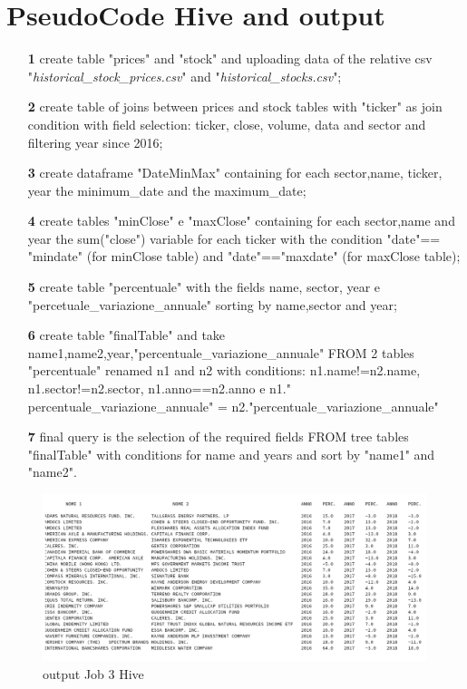 \documentclass[]{report}
\begin{document}
\section*{PseudoCode Hive and output}
	\begin{itemize}
	\item[\textbf{1}] create table "prices" and "stock" and uploading data of the relative csv "\textit{historical\_stock\_prices.csv}" and "\textit{historical\_stocks.csv}";
	\item[\textbf{2}] create table of joins between prices and stock tables with "ticker" as join condition with field selection: ticker, close, volume, data and sector and filtering year since 2016;
	\item[\textbf{3}]  create dataframe "DateMinMax" containing for each sector,name, ticker, year the minimum\_date and the maximum\_date;
	\item[\textbf{4}] create tables "minClose" e "maxClose" containing for each sector,name and year the sum("close") variable for each ticker with the condition "date"== "mindate" (for minClose table) and "date"=="maxdate" (for maxClose table);
	\item[\textbf{5}] create table "percentuale" with the fields name, sector, year e "percetuale\_variazione\_annuale" sorting by name,sector and year;
	\item[\textbf{6}] create table "finalTable" and take name1,name2,year,"percentuale\_variazione\_annuale" FROM 2 tables "percentuale" renamed n1 and n2 with conditions: n1.name!=n2.name, n1.sector!=n2.sector, n1.anno==n2.anno e n1." percentuale\_variazione\_annuale" = n2."percentuale\_variazione\_annuale" 
	\item[\textbf{7}] final query is the selection of the required fields FROM tree tables "finalTable"  with conditions for name and years and sort by "name1" and "name2".
\end{itemize}

\begin{center}
	\begin{figure}[!htb]
		\hspace{-3 cm}
		\includegraphics[width=1.5 \linewidth]{figure/output3hive}
		\caption{output Job 3 Hive}
	\end{figure}
\end{center}
\newpage
\end{document}
